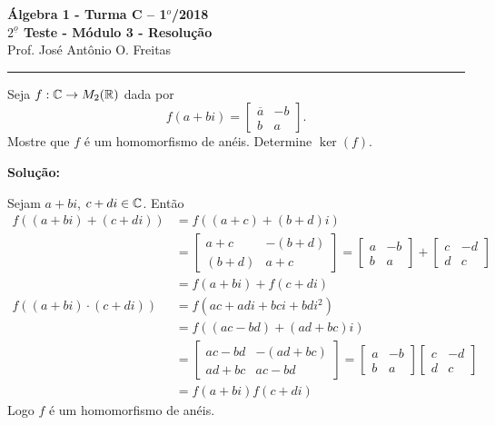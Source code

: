 \documentclass[12pt]{article}
\begin{document}


\begin{center}
{\Large\bf {\'A}lgebra 1 - Turma C -- 1$^{o}$/2018} \\ \vspace{9pt} {\large\bf
  $2^{\underline{o}}$ Teste - M\'odulo 3 - Resolu\c{c}\~ao}\\
\vspace{9pt} Prof. Jos{\'e} Ant{\^o}nio O. Freitas
\end{center}
\hrule

\vspace{.6cm}

\questao Seja $f : \mathbb{C} \to M_2(\mathbb{R})$ dada por
\[
	f(a + bi) = \begin{bmatrix}
		\overline{a} & -b\\
		b & a
	\end{bmatrix}.
\]
Mostre que $f$ \'e um homomorfismo de an\'eis. Determine $\ker(f)$.

\noindent\textbf{Solu\c{c}\~ao:}

Sejam $a + bi$, $c + di \in \mathbb{C}$. Ent\~ao
\begin{align*}
	f((a + bi) + (c + di)) &= f((a + c) + (b + d)i) \\&= \begin{bmatrix}
		a + c & -(b + d)\\
		(b + d) & a + c
	\end{bmatrix} = \begin{bmatrix}
		a & -b\\
		b & a
	\end{bmatrix} + \begin{bmatrix}
		c & -d\\
		d & c
	\end{bmatrix}\\ &= f(a + bi) + f(c + di)\\
	f((a + bi)\cdot (c + di)) &= f(ac + adi + bci + bdi^2) \\ &= f((ac - bd) + (ad + bc)i) \\ &= \begin{bmatrix}
		ac - bd & -(ad + bc)\\
		ad + bc & ac - bd
	\end{bmatrix} = \begin{bmatrix}
		a & -b\\
		b & a
	\end{bmatrix} \begin{bmatrix}
		c & -d\\
		d & c
	\end{bmatrix}\\ &= f(a + bi)f(c + di)
\end{align*}
Logo $f$ \'e um homomorfismo de an\'eis.
\end{document}

